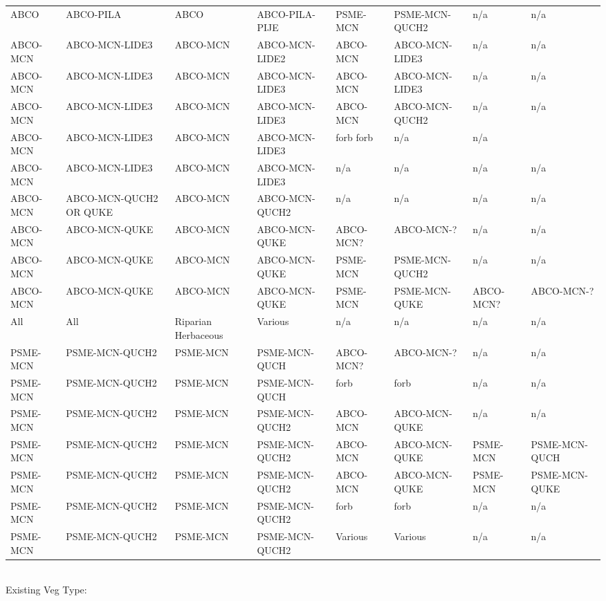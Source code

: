\documentclass{article}
\begin{document}
\begin{tabular}{llllllll}
ABCO	&ABCO-PILA	&ABCO	&ABCO-PILA-PIJE	&PSME-MCN	&PSME-MCN-QUCH2	&n/a	&n/a\\
ABCO-MCN	&ABCO-MCN-LIDE3	&ABCO-MCN	&ABCO-MCN-LIDE2	&ABCO-MCN	&ABCO-MCN-LIDE3	&n/a	&n/a\\
ABCO-MCN	&ABCO-MCN-LIDE3	&ABCO-MCN	&ABCO-MCN-LIDE3	&ABCO-MCN	&ABCO-MCN-LIDE3	&n/a	&n/a\\
ABCO-MCN&	ABCO-MCN-LIDE3	&ABCO-MCN	&ABCO-MCN-LIDE3	&ABCO-MCN	&ABCO-MCN-QUCH2	&n/a	&n/a\\
ABCO-MCN	&	ABCO-MCN-LIDE3	&ABCO-MCN	&ABCO-MCN-LIDE3	&forb	forb&	n/a	&n/a\\
ABCO-MCN&	ABCO-MCN-LIDE3	&ABCO-MCN	&ABCO-MCN-LIDE3	&n/a	&n/a	&n/a&	n/a\\
ABCO-MCN&	ABCO-MCN-QUCH2 OR QUKE	&ABCO-MCN	&ABCO-MCN-QUCH2	&n/a&	n/a	&n/a	&n/a\\
ABCO-MCN	&	ABCO-MCN-QUKE	&ABCO-MCN	&ABCO-MCN-QUKE	&ABCO-MCN?	&ABCO-MCN-?	&n/a	&n/a\\
ABCO-MCN	&	ABCO-MCN-QUKE	&ABCO-MCN	&ABCO-MCN-QUKE	&PSME-MCN	&PSME-MCN-QUCH2	&n/a&	n/a\\
ABCO-MCN	&	ABCO-MCN-QUKE	&ABCO-MCN	&ABCO-MCN-QUKE	&PSME-MCN	&PSME-MCN-QUKE	&ABCO-MCN?	&ABCO-MCN-?\\
All	&All	&Riparian Herbaceous	&Various	&n/a&	n/a	&n/a	&n/a\\
PSME-MCN	&PSME-MCN-QUCH2	&PSME-MCN	&PSME-MCN-QUCH	&ABCO-MCN?	&ABCO-MCN-?		&n/a		&n/a\\
PSME-MCN	&PSME-MCN-QUCH2	&PSME-MCN	&PSME-MCN-QUCH	&forb		&forb			&n/a		&n/a\\
PSME-MCN	&PSME-MCN-QUCH2	&PSME-MCN	&PSME-MCN-QUCH2	&ABCO-MCN	&ABCO-MCN-QUKE	&n/a		&n/a\\
PSME-MCN	&PSME-MCN-QUCH2	&PSME-MCN	&PSME-MCN-QUCH2	&ABCO-MCN	&ABCO-MCN-QUKE	&PSME-MCN	&PSME-MCN-QUCH\\
PSME-MCN	&PSME-MCN-QUCH2	&PSME-MCN	&PSME-MCN-QUCH2	&ABCO-MCN	&ABCO-MCN-QUKE	&PSME-MCN	&PSME-MCN-QUKE\\
PSME-MCN	&PSME-MCN-QUCH2	&PSME-MCN	&PSME-MCN-QUCH2	&forb		&forb			&n/a		&n/a\\
PSME-MCN	&PSME-MCN-QUCH2	&PSME-MCN	&PSME-MCN-QUCH2	&Various		&Various			&n/a		&n/a\\
\end{tabular}\\
\normalsize
Existing Veg Type: \\
\footnotesize
\end{document}
